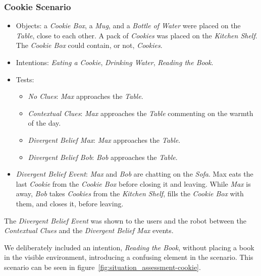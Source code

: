 \subsubsection{Cookie Scenario}
\begin{itemize}
\item Objects: a \textit{Cookie Box}, a \textit{Mug}, and a \textit{Bottle of Water} were placed on the \textit{Table}, close to each other. A pack of \textit{Cookies} was placed on the \textit{Kitchen Shelf}. The \textit{Cookie Box} could contain, or not, \textit{Cookies}.
\item Intentions: \textit{Eating a Cookie}, \textit{Drinking Water}, \textit{Reading the Book}.
\item Tests:
\begin{itemize}
	\item \textit{No Clues}: \textit{Max} approaches the \textit{Table}.
    \item \textit{Contextual Clues}: \textit{Max} approaches the \textit{Table} commenting on the warmth of the day.
	\item \textit{Divergent Belief Max}: \textit{Max} approaches the \textit{Table}.
	\item \textit{Divergent Belief Bob}: \textit{Bob} approaches the \textit{Table}.
\end{itemize}
\item  \textit{Divergent Belief Event}:  \textit{Max} and \textit{Bob} are chatting on the \textit{Sofa}. Max eats the last \textit{Cookie} from the \textit{Cookie Box} before closing it and leaving. While \textit{Max} is away, \textit{Bob} takes \textit{Cookies} from the \textit{Kitchen Shelf}, fills the \textit{Cookie Box} with them, and closes it, before leaving.
\end{itemize}

The \textit{Divergent Belief Event} was shown to the users and the robot between the \textit{Contextual Clues} and the \textit{Divergent Belief Max} events. 

We deliberately included an intention, \textit{Reading the Book}, without placing a book in the visible environment, introducing a confusing element in the scenario. This scenario can be seen in figure~\ref{fig:situation_assessment-cookie}.


